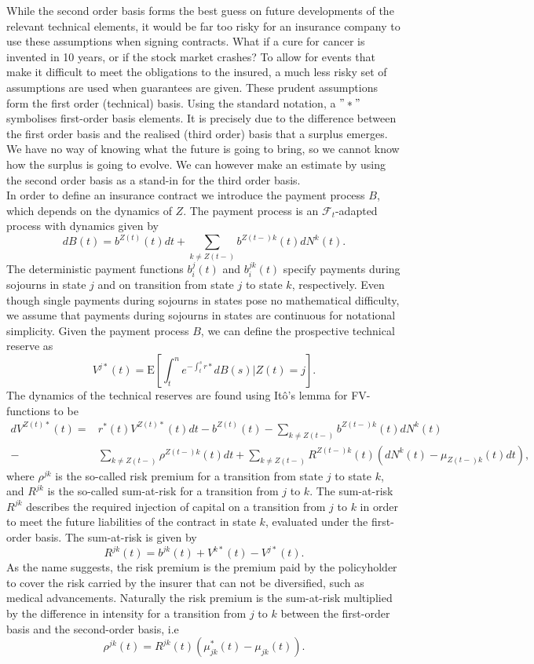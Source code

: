 \documentclass[12pt]{article}
\newcommand{\E}{\text{E}}
\theoremstyle{my_thm}
\begin{document}
While the second order basis forms the best guess on future developments of the relevant technical elements, it would be far too risky for an insurance company to use these assumptions when signing contracts. What if a cure for cancer is invented in 10 years, or if the stock market crashes? To allow for events that make it difficult to meet the obligations to the insured, a much less risky set of assumptions are used when guarantees are given. These prudent assumptions form the first order (technical) basis. Using the standard notation, a $"*"$ symbolises first-order basis elements. It is precisely due to the difference between the first order basis and the realised (third order) basis that a surplus emerges. We have no way of knowing what the future is going to bring, so we cannot know how the surplus is going to evolve. We can however make an estimate by using the second order basis as a stand-in for the third order basis.
\\
In order to define an insurance contract we introduce the payment process $B$, which depends on the dynamics of $Z$. The payment process is an $\mathcal{F}_t$-adapted process with dynamics given by
$$
dB(t)=b^{Z(t)}(t) dt +\sum_{k \neq Z(t-)} b^{Z(t-)k}(t)dN^k(t).
$$
The deterministic payment functions $b_i^j(t)$ and $b_i^{jk}(t)$ specify payments during sojourns in state $j$ and on transition from state $j$ to state $k$, respectively. Even though single payments during sojourns in states pose no mathematical difficulty, we assume that payments during sojourns in states are continuous for notational simplicity. Given the payment process $B$, we can define the prospective technical reserve as
$$
V^{j*}(t)=\E \left[ \int_t^n  e^{-\int_t^s r*} dB(s) |Z(t)=j \right].
$$
The dynamics of the technical reserves are found using Itô's lemma for FV-functions to be
\begin{align}
dV^{Z(t)*}(t)=&r^*(t)V^{Z(t)*}(t)dt - b^{Z(t)}(t) -\sum_{k\neq Z(t-)}b^{Z(t-)k}(t) dN^k(t)\nonumber
\\
-&\sum_{k\neq Z(t-)} \rho^{Z(t-)k}(t) dt
+
\sum_{k\neq Z(t-)} R^{Z(t-)k}(t)(dN^k(t)-\mu_{Z(t-)k}(t) dt), \label{eq:AAP}
\end{align}
where $\rho^{jk}$ is the so-called risk premium for a transition from state $j$ to state $k$, and $R^{jk}$ is the so-called sum-at-risk for a transition from $j$ to $k$. The sum-at-risk $R^{jk}$ describes the required injection of capital on a transition from $j$ to $k$ in order to meet the future liabilities of the contract in state $k$, evaluated under the first-order basis. The sum-at-risk is given by
$$
R^{jk}(t)=b^{jk}(t)+V^{k*}(t)-V^{j*}(t).
$$
As the name suggests, the risk premium is the premium paid by the policyholder to cover the risk carried by the insurer that can not be diversified, such as medical advancements. Naturally the risk premium is the sum-at-risk multiplied by the difference in intensity for a transition from $j$ to $k$ between the first-order basis and the second-order basis, i.e
$$
\rho^{jk}(t)=R^{jk}(t)(\mu^*_{jk}(t)-\mu_{jk}(t)).
$$
\end{document}
